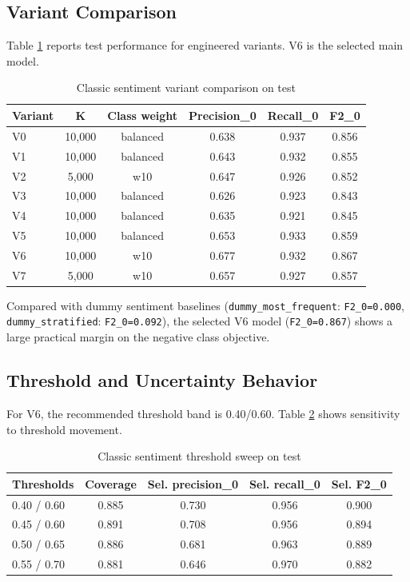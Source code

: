 \documentclass[12pt,a4paper]{article}
\begin{document}
\subsection{Variant Comparison}
Table \ref{tab:classic_variants} reports test performance for engineered variants. V6 is the selected main model.

\begin{table}[H]
\centering
\caption{Classic sentiment variant comparison on test}
\label{tab:classic_variants}
\begin{tabular}{lccccc}
\toprule
Variant & K & Class weight & Precision\_0 & Recall\_0 & F2\_0 \\
\midrule
V0 & 10,000 & balanced & 0.638 & 0.937 & 0.856 \\
V1 & 10,000 & balanced & 0.643 & 0.932 & 0.855 \\
V2 & 5,000 & w10 & 0.647 & 0.926 & 0.852 \\
V3 & 10,000 & balanced & 0.626 & 0.923 & 0.843 \\
V4 & 10,000 & balanced & 0.635 & 0.921 & 0.845 \\
V5 & 10,000 & balanced & 0.653 & 0.933 & 0.859 \\
V6 & 10,000 & w10 & 0.677 & 0.932 & 0.867 \\
V7 & 5,000 & w10 & 0.657 & 0.927 & 0.857 \\
\bottomrule
\end{tabular}
\end{table}

Compared with dummy sentiment baselines (\texttt{dummy\_most\_frequent}: \texttt{F2\_0=0.000}, \texttt{dummy\_stratified}: \texttt{F2\_0=0.092}), the selected V6 model (\texttt{F2\_0=0.867}) shows a large practical margin on the negative class objective.

\subsection{Threshold and Uncertainty Behavior}
For V6, the recommended threshold band is 0.40/0.60. Table \ref{tab:classic_threshold} shows sensitivity to threshold movement.

\begin{table}[H]
\centering
\caption{Classic sentiment threshold sweep on test}
\label{tab:classic_threshold}
\begin{tabular}{lcccc}
\toprule
Thresholds & Coverage & Sel. precision\_0 & Sel. recall\_0 & Sel. F2\_0 \\
\midrule
0.40 / 0.60 & 0.885 & 0.730 & 0.956 & 0.900 \\
0.45 / 0.60 & 0.891 & 0.708 & 0.956 & 0.894 \\
0.50 / 0.65 & 0.886 & 0.681 & 0.963 & 0.889 \\
0.55 / 0.70 & 0.881 & 0.646 & 0.970 & 0.882 \\
\bottomrule
\end{tabular}
\end{table}
\end{document}
